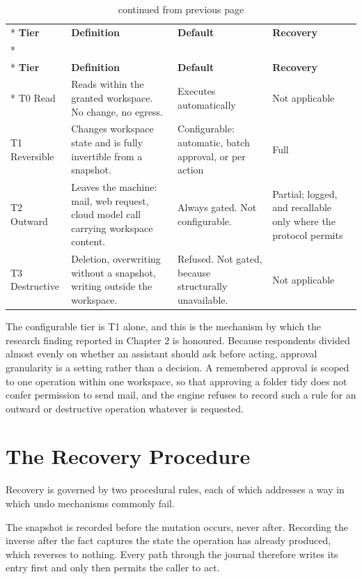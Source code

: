 \documentclass{FastFyp}
\begin{document}
{
\begin{longtable}{|p{2.4cm}|p{4.6cm}|p{3.4cm}|p{3.0cm}|}
\caption{The four risk tiers.}\label{tab:tiers}\\*
\hline
\textbf{Tier} & \textbf{Definition} & \textbf{Default} & \textbf{Recovery} \\*
\hline
\endfirsthead
\caption[]{continued from previous page}\\*
\hline
\textbf{Tier} & \textbf{Definition} & \textbf{Default} & \textbf{Recovery} \\*
\hline
\endhead
\hline
T0 Read & Reads within the granted workspace. No change, no egress. & Executes automatically & Not applicable \\
\hline
T1 Reversible & Changes workspace state and is fully invertible from a snapshot. & Configurable: automatic, batch approval, or per action & Full \\
\hline
T2 Outward & Leaves the machine: mail, web request, cloud model call carrying workspace content. & Always gated. Not configurable. & Partial; logged, and recallable only where the protocol permits \\
\hline
T3 Destructive & Deletion, overwriting without a snapshot, writing outside the workspace. & Refused. Not gated, because structurally unavailable. & Not applicable \\
\hline
\end{longtable}
}

The configurable tier is T1 alone, and this is the mechanism by which the research finding reported in Chapter 2 is honoured. Because respondents divided almost evenly on whether an assistant should ask before acting, approval granularity is a setting rather than a decision. A remembered approval is scoped to one operation within one workspace, so that approving a folder tidy does not confer permission to send mail, and the engine refuses to record such a rule for an outward or destructive operation whatever is requested.

\section{The Recovery Procedure}
Recovery is governed by two procedural rules, each of which addresses a way in which undo mechanisms commonly fail.

The snapshot is recorded before the mutation occurs, never after. Recording the inverse after the fact captures the state the operation has already produced, which reverses to nothing. Every path through the journal therefore writes its entry first and only then permits the caller to act.
\end{document}
